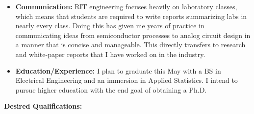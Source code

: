 \begin{itemize}
    \item \textbf{Communication:} RIT engineering focuses heavily on 
    laboratory classes, which means that students are required to 
    write reports summarizing labs in nearly every class. Doing this
    has given me years of practice in communicating ideas from 
    semiconductor processes to analog circuit design in a manner that 
    is concise and manageable. This directly transfers to research 
    and white-paper reports that I have worked on in the industry.

    \item \textbf{Education/Experience:} I plan to graduate 
    this May with a BS in Electrical Engineering and an immersion 
    in Applied Statistics. I intend to pursue higher education 
    with the end goal of obtaining a Ph.D.

\end{itemize}
\textbf{Desired Qualifications:}
